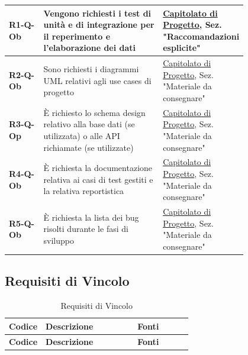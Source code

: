 \documentclass[a4paper,12pt]{article}
\begin{document}
{{\begin{longtable}{|l|P{0.5\linewidth}|P{0.3\linewidth}|}
                \textbf{R1-Q-Ob} & Vengono richiesti i test di unità e di integrazione per il reperimento e l’elaborazione dei dati & \hyperlink{capitolato}{Capitolato di Progetto}, \newline 
                Sez. "Raccomandazioni esplicite" \\
                \hline
                \textbf{R2-Q-Ob} & Sono richiesti i diagrammi UML relativi agli use cases di progetto & \hyperlink{capitolato}{Capitolato di Progetto}, \newline 
                Sez. "Materiale da consegnare" \\
                \hline
                \textbf{R3-Q-Op} & È richiesto lo schema design relativo alla base dati (se utilizzata) o alle API richiamate (se utilizzate) & \hyperlink{capitolato}{Capitolato di Progetto}, \newline 
                Sez. "Materiale da consegnare" \\
                \hline
                \textbf{R4-Q-Ob} & È richiesta la documentazione relativa ai casi di test gestiti e la relativa reportistica & \hyperlink{capitolato}{Capitolato di Progetto}, \newline 
                Sez. "Materiale da consegnare" \\
                \hline
                \textbf{R5-Q-Ob} & È richiesta la lista dei bug risolti durante le fasi di sviluppo & \hyperlink{capitolato}{Capitolato di Progetto}, \newline 
                Sez. "Materiale da consegnare" \\
                \hline
            \end{longtable}
        }
        \subsection{Requisiti di Vincolo} {
            \begin{longtable}{|l|P{0.5\linewidth}|P{0.3\linewidth}|}
                \caption{Requisiti di Vincolo} \\
                
                \hline
                \textbf{Codice} & \textbf{Descrizione} & \textbf{Fonti} \\
                \hline
                \endfirsthead
                
                \hline
                \textbf{Codice} & \textbf{Descrizione} & \textbf{Fonti} \\
                \hline
                \endhead
                

\end{longtable}}}
\end{document}
